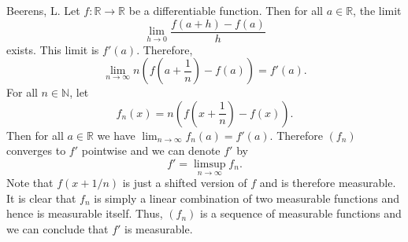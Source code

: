 \begin{solution}[5.21]{Beerens, L.}
    Let $f:\mathbb{R}\rightarrow\mathbb{R}$ be a differentiable function. Then for all $a\in\mathbb{R}$, the limit 
    $$
        \lim_{h\rightarrow 0}\frac{f(a+h)-f(a)}{h}
    $$
    exists. This limit is $f'(a)$. Therefore, 
    $$
        \lim_{n\rightarrow\infty}n\left(f\left(a+\frac{1}{n}\right)-f(a)\right) = f'(a).
    $$
    For all $n\in\mathbb{N}$, let 
    $$
        f_n(x) = n\left(f\left(x+\frac{1}{n}\right)-f(x)\right).
    $$
    Then for all $a\in\mathbb{R}$ we have $\lim_{n\rightarrow\infty}f_n(a) = f'(a)$. Therefore $(f_n)$ converges to $f'$ pointwise and we can denote $f'$ by 
    $$
        f' = \limsup_{n\rightarrow\infty}f_n.
    $$
    Note that $f(x+1/n)$ is just a shifted version of $f$ and is therefore measurable. It is clear that $f_n$ is simply a linear combination of two measurable functions and hence is measurable itself. Thus, $(f_n)$ is a sequence of measurable functions and we can conclude that $f'$ is measurable.
\end{solution}